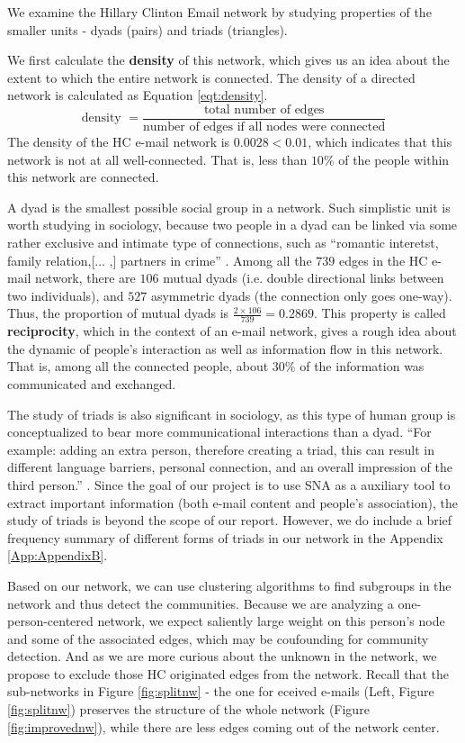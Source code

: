 We examine the Hillary Clinton Email network by studying properties of the smaller units - dyads (pairs) and triads (triangles).   

We first calculate the {\bf density} of this network, which gives us an idea about the extent to which the entire network is connected. The density of a directed network is calculated as Equation \ref{eqt:density}.
\begin{equation}
\label{eqt:density}
\mbox{density }= \frac{\mbox{total number of edges}}{\mbox{number of edges if all nodes were connected}}
\end{equation}
The density of the HC e-mail network is $0.0028<0.01$, which indicates that this network is not at all well-connected. That is, less than $10\%$ of the people within this network are connected. 

A dyad is the smallest possible social group in a network. 
Such simplistic unit is worth studying in sociology, because two people in a dyad can be linked via some rather exclusive and intimate type of connections, such as ``romantic interetst, family relation,[... ,] partners in crime'' \cite{wiki_dyad}.
Among all the $739$ edges in the HC e-mail network, there are $106$ mutual dyads (i.e. double directional links between two individuals), and $527$ asymmetric dyads (the connection only goes one-way). 
Thus, the proportion of mutual dyads is $\frac{2 \times 106}{739}=0.2869$. 
This property is called {\bf reciprocity}, which in the context of an e-mail network, gives a rough idea about the dynamic of people's interaction as well as information flow in this network. 
That is, among all the connected people, about $30\%$ of the information was communicated and exchanged. 

The study of triads is also significant in sociology, as this type of human group is conceptualized to bear more communicational interactions than a dyad. 
``For example: adding an extra person, therefore creating a triad, this can result in different language barriers, personal connection, and an overall impression of the third person.'' \cite{wiki_triad}.
Since the goal of our project is to use SNA as a auxiliary  tool to extract important information (both e-mail content and people's association), the study of triads is beyond the scope of our report. 
However, we do include a brief frequency summary of different forms of triads in our network in the Appendix \ref{App:AppendixB}.

Based on our network, we can use clustering algorithms to find subgroups in the network and thus detect the communities. 
Because we are analyzing a one-person-centered network, we expect saliently large weight on this person's node and some of the associated edges, which may be coufounding for community detection. 
And as we are more curious about the unknown in the network, we propose to exclude those HC originated edges from the network. Recall that the sub-networks in Figure \ref{fig:splitnw} - the one for eceived e-mails (Left, Figure \ref{fig:splitnw}) preserves the structure of the whole network (Figure \ref{fig:improvednw}), while there are less edges coming out of the network center.  

